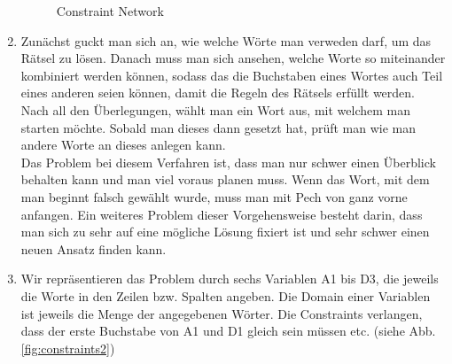 \documentclass[a4paper]{scrartcl}
\begin{document}
\begin{enumerate}
\begin{landscape}
\begin{figure}[h]
                \caption{Constraint Network}
                \label{fig:constraints}
            \end{figure}
            \vspace*{\fill}
        \end{landscape}
	   
    \item
	Zunächst guckt man sich an, wie welche Wörte man verweden darf, um das Rätsel zu lösen. Danach
	muss man sich ansehen, welche Worte so miteinander kombiniert werden können, sodass das die Buchstaben
	eines Wortes auch Teil eines anderen seien können, damit die Regeln des Rätsels erfüllt werden. \\
	Nach all den Überlegungen, wählt man ein Wort aus, mit welchem man starten möchte. Sobald man dieses 
	dann gesetzt hat, prüft man wie man andere Worte an dieses anlegen kann. \\
	Das Problem bei diesem Verfahren ist, dass man nur schwer einen Überblick behalten kann und man viel
	voraus planen muss. Wenn das Wort, mit dem man beginnt falsch gewählt wurde, muss man mit Pech von
	ganz vorne anfangen. Ein weiteres Problem dieser Vorgehensweise besteht darin, dass man sich zu sehr 
	auf eine mögliche Lösung fixiert ist und sehr schwer einen neuen Ansatz finden kann. \\

    \item
        Wir repräsentieren das Problem durch sechs Variablen A1 bis D3, die
        jeweils die Worte in den Zeilen bzw. Spalten angeben. Die Domain einer
        Variablen ist jeweils die Menge der angegebenen Wörter.
        Die Constraints verlangen, dass der erste Buchstabe von A1 und D1
        gleich sein müssen etc. (siehe Abb. \ref{fig:constraints2})


\end{enumerate}
\end{document}
